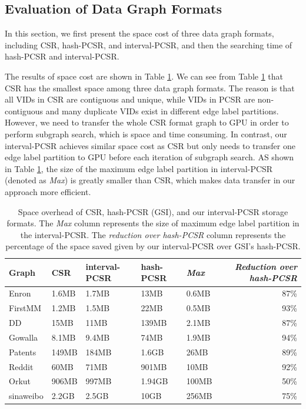 \subsection{Evaluation of Data Graph Formats\label{sec:evalgraphformat}}
In this section, we first present the space cost of three data graph formats, including CSR, hash-PCSR, and  interval-PCSR, and then the searching time of hash-PCSR and interval-PCSR.

The results of space cost are shown in Table \ref{tab:graphsize}. We can see from Table \ref{tab:graphsize} that CSR has the smallest space among three data graph formats. The reason is that all VIDs in CSR are contiguous and unique, while VIDs in PCSR are non-contiguous and many duplicate VIDs exist in different edge label partitions. However, we need to transfer the whole CSR format graph to GPU in order to perform subgraph search, which is space and time consuming. In contrast, our interval-PCSR achieves similar space cost as CSR but only needs to transfer one edge label partition to GPU before each iteration of subgraph search. AS shown in Table \ref{tab:graphsize}, the size of the maximum edge label partition in interval-PCSR (denoted as \emph{Max}) is greatly smaller than CSR, which makes data transfer in our approach more efficient.


\begin{table}
\centering
  \caption{Space overhead of CSR, hash-PCSR (GSI), and our interval-PCSR storage formats. The \emph{Max} column represents the size of maximum edge label partition in
  the interval-PCSR. The \emph{reduction over hash-PCSR} column represents the percentage of the space saved given by our interval-PCSR over GSI's hash-PCSR.}
  \label{tab:graphsize}
  \scriptsize
  \begin{tabular}{lllllr}
  \toprule
    \textbf{Graph} &\textbf{CSR}&\textbf{interval-PCSR}&\textbf{hash-PCSR}&\emph{\textbf{Max}}&\emph{Reduction over hash-PCSR}\\
    \midrule
    Enron 		&1.6MB	&1.7MB	&13MB	&0.6MB	&87\% \\
    FirstMM 	&1.2MB	&1.5MB	&22MB	&0.5MB	&93\% \\
    DD 			&15MB	&11MB	&139MB	&2.1MB	&87\% \\
    Gowalla 	&8.1MB	&9.4MB	&74MB	&1.9MB	&94\% \\
    Patents 	&149MB	&184MB	&1.6GB	&26MB	&89\% \\
    Reddit 		&60MB	&71MB	&901MB	&10MB	&92\% \\
    Orkut 		&906MB	&997MB	&1.94GB	&100MB	&50\% \\
    sinaweibo	&2.2GB	&2.5GB	&10GB	&256MB	&75\% \\

    \bottomrule
  \end{tabular}
\end{table}


